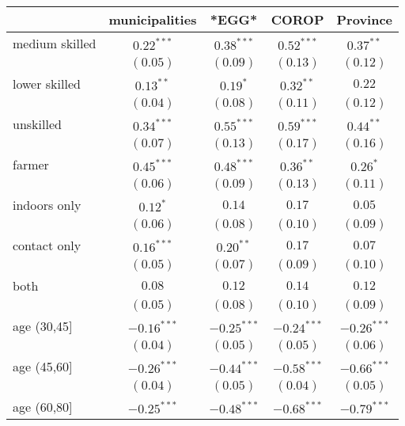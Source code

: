 
\begin{table}
\begin{center}
\begin{tabular}{l c c c c}
\hline
 & municipalities & *EGG* & COROP & Province \\
\hline
medium skilled     & $0.22^{***}$  & $0.38^{***}$  & $0.52^{***}$  & $0.37^{**}$   \\
                   & $(0.05)$      & $(0.09)$      & $(0.13)$      & $(0.12)$      \\
lower skilled      & $0.13^{**}$   & $0.19^{*}$    & $0.32^{**}$   & $0.22$        \\
                   & $(0.04)$      & $(0.08)$      & $(0.11)$      & $(0.12)$      \\
unskilled          & $0.34^{***}$  & $0.55^{***}$  & $0.59^{***}$  & $0.44^{**}$   \\
                   & $(0.07)$      & $(0.13)$      & $(0.17)$      & $(0.16)$      \\
farmer             & $0.45^{***}$  & $0.48^{***}$  & $0.36^{**}$   & $0.26^{*}$    \\
                   & $(0.06)$      & $(0.09)$      & $(0.13)$      & $(0.11)$      \\
indoors only       & $0.12^{*}$    & $0.14$        & $0.17$        & $0.05$        \\
                   & $(0.06)$      & $(0.08)$      & $(0.10)$      & $(0.09)$      \\
contact only       & $0.16^{***}$  & $0.20^{**}$   & $0.17$        & $0.07$        \\
                   & $(0.05)$      & $(0.07)$      & $(0.09)$      & $(0.10)$      \\
both               & $0.08$        & $0.12$        & $0.14$        & $0.12$        \\
                   & $(0.05)$      & $(0.08)$      & $(0.10)$      & $(0.09)$      \\
age (30,45]        & $-0.16^{***}$ & $-0.25^{***}$ & $-0.24^{***}$ & $-0.26^{***}$ \\
                   & $(0.04)$      & $(0.05)$      & $(0.05)$      & $(0.06)$      \\
age (45,60]        & $-0.26^{***}$ & $-0.44^{***}$ & $-0.58^{***}$ & $-0.66^{***}$ \\
                   & $(0.04)$      & $(0.05)$      & $(0.04)$      & $(0.05)$      \\
age (60,80]        & $-0.25^{***}$ & $-0.48^{***}$ & $-0.68^{***}$ & $-0.79^{***}$ \\

\end{tabular}
\end{center}
\end{table}
